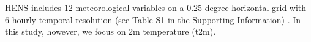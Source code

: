 \documentclass[draft]{agujournal2019}
\newcommand{\newTxt}{\textcolor{black}}
\begin{document}
HENS includes 12 meteorological variables on a 0.25-degree horizontal grid  with 6-hourly temporal resolution (see Table S1 in the Supporting Information) \citep{Mahesh2024hugeensemblespartii}. In this study, however, we focus on 2m temperature (t2m). %

\end{document}

